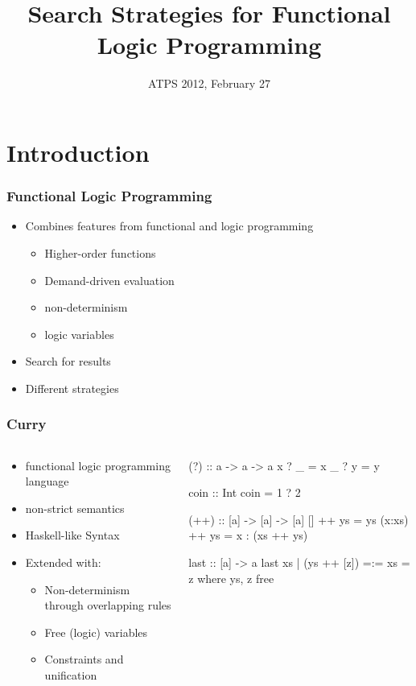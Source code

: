 \documentclass[
,hyperref={pdfpagelabels=false}
]{beamer}
\title[Search Strategies for FLP]
{Search Strategies for Functional Logic Programming}
\date[ATPS 2012]{ATPS 2012, February 27}
\author[Hanus, Peemöller, \underline{Reck}]{%
\texorpdfstring
  {Michael Hanus \and Björn Peemöller \and \underline{Fabian Reck}}
  {Michael Hanus \and Björn Peemöller \and Fabian Reck}
}
\institute{Kiel University}
\begin{document}
\begin{frame}%
\titlepage
\end{frame}


\section{Introduction}

\begin{frame}[fragile]%
\frametitle{Functional Logic Programming}
\begin{itemize}
\item Combines features from functional and logic programming
  \begin{itemize}
   \item Higher-order functions
   \item Demand-driven evaluation
   \item non-determinism
   \item logic variables
  \end{itemize}
\item Search for results
\item Different strategies
\end{itemize}
\end{frame}

\begin{frame}[fragile]%
\frametitle{Curry}
\begin{columns}[t]

\begin{column}{.4\textwidth}
\begin{itemize}
\item functional logic programming language
\item non-strict semantics
\item Haskell-like Syntax
\item Extended with:
  \begin{itemize}
  \item Non-determinism through overlapping rules
  \item Free (logic) variables
  \item Constraints and unification
  \end{itemize}
\end{itemize}
\end{column}

\begin{column}{.5\textwidth}
\begin{curry}%
(?) :: a -> a -> a
x ? _ = x
_ ? y = y

coin :: Int
coin = 1 ? 2

(++) :: [a] -> [a] -> [a]
[] ++ ys = ys
(x:xs) ++ ys = x : (xs ++ ys)

last :: [a] -> a
last xs | (ys ++ [z]) =:= xs = z
  where ys, z free
\end{curry}
\end{column}

\end{columns}
\end{frame}
\end{document}
